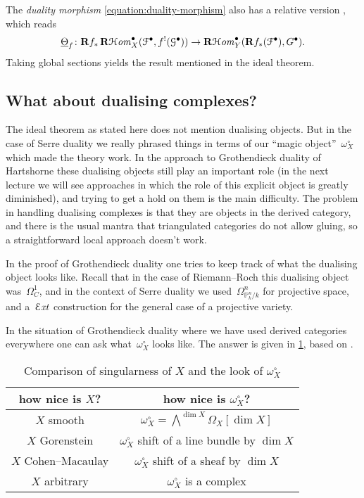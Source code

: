 \begin{remark}
  The \emph{duality morphism} \eqref{equation:duality-morphism} also has a relative version \cite[3.4.4]{conrad-grothendieck-duality-and-base-change}, which reads
  \begin{equation}
    \underline{\Theta}_f\colon\mathbf{R} f_*\operatorname{\mathbf{R}\mathcal{H}\mathit{om}}_X^\bullet(\mathcal{F}^\bullet,f^!(\mathcal{G}^\bullet))\to\operatorname{\mathbf{R}\mathcal{H}\mathit{om}}_Y^\bullet(\mathbf{R} f_*(\mathcal{F}^\bullet),G^\bullet).
  \end{equation}
  Taking global sections yields the result mentioned in the ideal theorem.
\end{remark}

\subsection{What about dualising complexes?}
The ideal theorem as stated here does not mention dualising objects. But in the case of Serre duality we really phrased things in terms of our ``magic object''~$\omega_X^\circ$ which made the theory work. In the approach to Grothendieck duality of Hartshorne these dualising objects still play an important role (in the next lecture we will see approaches in which the role of this explicit object is greatly diminished), and trying to get a hold on them is the main difficulty. The problem in handling dualising complexes is that they are objects in the derived category, and there is the usual mantra that triangulated categories do not allow gluing, so a straightforward local approach doesn't work.

In the proof of Grothendieck duality one tries to keep track of what the dualising object looks like. Recall that in the case of Riemann--Roch this dualising object was~$\Omega_C^1$, and in the context of Serre duality we used~$\Omega_{\mathbb{P}_k^n/k}^n$ for projective space, and a~$\operatorname{\mathcal{E}\mathit{xt}}$ construction for the general case of a projective variety.

In the situation of Grothendieck duality where we have used derived categories everywhere one can ask what~$\omega_X^\circ$ looks like. The answer is given in \cref{table:comparison-X-dualising-sheaf}, based on \cite[\S V.9]{hartshorne-residues-and-duality}.

\begin{table}[p]
  \centering
  \begin{tabular}{cc}
    \toprule
    how nice is $X$? & how nice is $\omega_X^\circ$? \\\midrule
    $X$ smooth & $\omega_X^\circ=\bigwedge^{\dim X}\Omega_X[\dim X]$ \\
    $X$ Gorenstein & $\omega_X^\circ$ shift of a line bundle by $\dim X$ \\
    $X$ Cohen--Macaulay & $\omega_X^\circ$ shift of a sheaf by $\dim X$ \\
    $X$ arbitrary & $\omega_X^\circ$ is a complex \\
    \bottomrule
  \end{tabular}
  \caption{Comparison of singularness of $X$ and the look of $\omega_X^\circ$}
  \label{table:comparison-X-dualising-sheaf}
\end{table}

